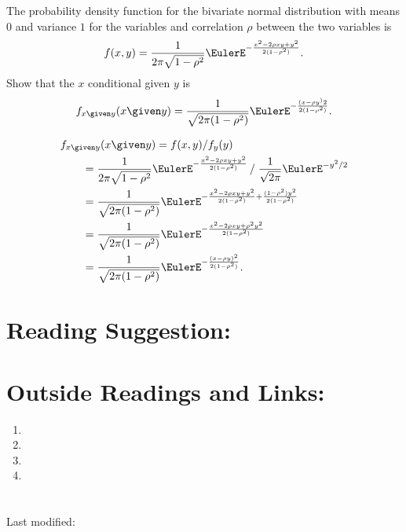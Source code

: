 \documentclass[12pt]{article}
\begin{document}
\begin{exercise}
    The probability density function for the bivariate normal
    distribution with means \( 0 \) and variance \( 1 \) for the
    variables and correlation \( \rho \) between the two variables is
    \[
        f(x, y) = \frac{1}{2\pi \sqrt{1 - \rho^2}} \EulerE^{- \frac{x^2
        - 2 \rho x y + y^2}{2(1-\rho^2)}}.
    \] Show that the \( x \) conditional given \( y \) is
    \[
        f_{x \given y}(x \given y) = \frac{1}{\sqrt{2\pi (1 - \rho^2)}}
        \EulerE^{- \frac{(x - \rho y^)2}{2(1-\rho^2)} }.
    \]
\end{exercise}
\begin{solution}
    \begin{align*}
        &f_{x \given y}(x \given y) = f(x,y)/f_y(y) \\
        &\qquad= \frac{1}{2\pi \sqrt{1 - \rho^2}} \EulerE^{- \frac{x^2 -
        2 \rho x y + y^2}{2(1-\rho^2)}} \left / \right. \frac{1}{\sqrt{2\pi}}
        \EulerE^{-y^2/2} \\
        &\qquad= \frac{1}{\sqrt{2\pi (1 - \rho^2)}} \EulerE^{- \frac{x^2
        - 2 \rho x y + y^2}{2(1-\rho^2)} + \frac{(1-\rho^2) y^2}{2(1-\rho^2)}}
        \\
        &\qquad= \frac{1}{\sqrt{2\pi (1 - \rho^2)}} \EulerE^{- \frac{x^2
        - 2 \rho x y + \rho^2 y^2}{2(1-\rho^2)} } \\
        &\qquad= \frac{1}{\sqrt{2\pi (1 - \rho^2)}} \EulerE^{- \frac{(x
        - \rho y)^2}{2(1-\rho^2)} }.
    \end{align*}
\end{solution}

\hr

\section*{Reading Suggestion:}




\hr

\section*{Outside Readings and Links:}
\begin{enumerate}
    \item
    \item
    \item
    \item
\end{enumerate}

\section*{\solutionsname} \loadSolutions

\hr

\mydisclaim \myfooter

Last modified:  \flastmod
\end{document}
